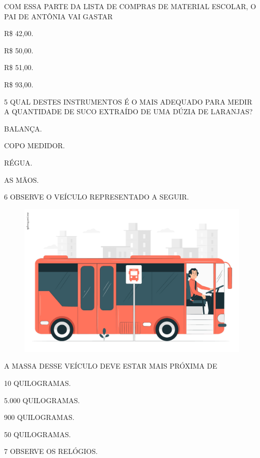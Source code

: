\pagebreak
COM ESSA PARTE DA LISTA DE COMPRAS DE MATERIAL ESCOLAR, O PAI DE ANTÔNIA VAI GASTAR

\begin{escolha}[itemsep=0pt]
\item R\$ 42,00.

\item R\$ 50,00.

\item R\$ 51,00.

\item R\$ 93,00.
\end{escolha}

\num{5} QUAL DESTES INSTRUMENTOS É O MAIS ADEQUADO PARA MEDIR A QUANTIDADE DE SUCO EXTRAÍDO DE UMA DÚZIA DE LARANJAS?

\begin{escolha}[itemsep=0pt]
\item BALANÇA.

\item COPO MEDIDOR.

\item RÉGUA.

\item AS MÃOS.
\end{escolha}

\num{6} OBSERVE O VEÍCULO REPRESENTADO A SEGUIR.

\begin{figure}[htpb!]
\centering
\includegraphics[width=.3\textwidth]{./media/SAEB_1ANO_MAT_FIGURA138.png}
\end{figure}

A MASSA DESSE VEÍCULO DEVE ESTAR MAIS PRÓXIMA DE

\begin{escolha}[itemsep=0pt]
\item 10 QUILOGRAMAS.

\item 5.000 QUILOGRAMAS.

\item 900 QUILOGRAMAS.

\item 50 QUILOGRAMAS.
\end{escolha}

\pagebreak
\num{7} OBSERVE OS RELÓGIOS.

